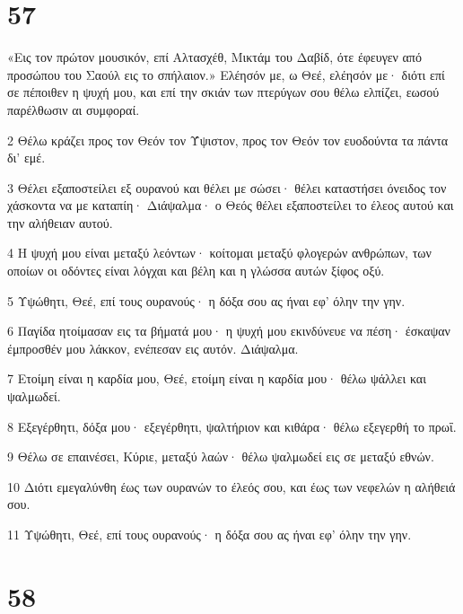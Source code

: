 \chapter{57}

\par «Εις τον πρώτον μουσικόν, επί Αλτασχέθ, Μικτάμ του Δαβίδ, ότε έφευγεν από προσώπου του Σαούλ εις το σπήλαιον.» Ελέησόν με, ω Θεέ, ελέησόν με· διότι επί σε πέποιθεν η ψυχή μου, και επί την σκιάν των πτερύγων σου θέλω ελπίζει, εωσού παρέλθωσιν αι συμφοραί.
\par 2 Θέλω κράζει προς τον Θεόν τον Ύψιστον, προς τον Θεόν τον ευοδούντα τα πάντα δι' εμέ.
\par 3 Θέλει εξαποστείλει εξ ουρανού και θέλει με σώσει· θέλει καταστήσει όνειδος τον χάσκοντα να με καταπίη· Διάψαλμα· ο Θεός θέλει εξαποστείλει το έλεος αυτού και την αλήθειαν αυτού.
\par 4 Η ψυχή μου είναι μεταξύ λεόντων· κοίτομαι μεταξύ φλογερών ανθρώπων, των οποίων οι οδόντες είναι λόγχαι και βέλη και η γλώσσα αυτών ξίφος οξύ.
\par 5 Υψώθητι, Θεέ, επί τους ουρανούς· η δόξα σου ας ήναι εφ' όλην την γην.
\par 6 Παγίδα ητοίμασαν εις τα βήματά μου· η ψυχή μου εκινδύνευε να πέση· έσκαψαν έμπροσθέν μου λάκκον, ενέπεσαν εις αυτόν. Διάψαλμα.
\par 7 Ετοίμη είναι η καρδία μου, Θεέ, ετοίμη είναι η καρδία μου· θέλω ψάλλει και ψαλμωδεί.
\par 8 Εξεγέρθητι, δόξα μου· εξεγέρθητι, ψαλτήριον και κιθάρα· θέλω εξεγερθή το πρωΐ.
\par 9 Θέλω σε επαινέσει, Κύριε, μεταξύ λαών· θέλω ψαλμωδεί εις σε μεταξύ εθνών.
\par 10 Διότι εμεγαλύνθη έως των ουρανών το έλεός σου, και έως των νεφελών η αλήθειά σου.
\par 11 Υψώθητι, Θεέ, επί τους ουρανούς· η δόξα σου ας ήναι εφ' όλην την γην.

\chapter{58}

